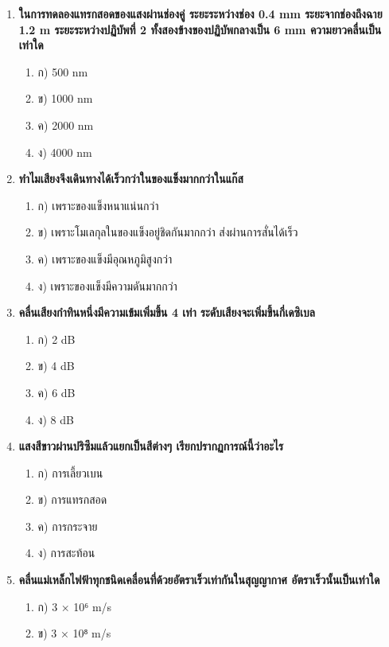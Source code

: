 \documentclass[12pt]{article}
\begin{document}
\begin{enumerate}
\begin{enumerate}
\item ค) แสง → อินฟราเรด → ไมโครเวฟ → คลื่นวิทยุ
\item ง) คลื่นวิทยุ → อัลตราไวโอเลต → รังสีเอกซ์ → รังสีแกมมา
\end{enumerate}
\item \textbf{ในการทดลองแทรกสอดของแสงผ่านช่องคู่ ระยะระหว่างช่อง 0.4 mm ระยะจากช่องถึงฉาย 1.2 m ระยะระหว่างปฏิบัพที่ 2 ทั้งสองข้างของปฏิบัพกลางเป็น 6 mm ความยาวคลื่นเป็นเท่าใด}
\begin{enumerate}
\item ก) 500 nm
\item ข) 1000 nm
\item ค) 2000 nm
\item ง) 4000 nm
\end{enumerate}
\item \textbf{ทำไมเสียงจึงเดินทางได้เร็วกว่าในของแข็งมากกว่าในแก๊ส}
\begin{enumerate}
\item ก) เพราะของแข็งหนาแน่นกว่า
\item ข) เพราะโมเลกุลในของแข็งอยู่ชิดกันมากกว่า ส่งผ่านการสั่นได้เร็ว
\item ค) เพราะของแข็งมีอุณหภูมิสูงกว่า
\item ง) เพราะของแข็งมีความดันมากกว่า
\end{enumerate}
\item \textbf{คลื่นเสียงกำทินหนึ่งมีความเข้มเพิ่มขึ้น 4 เท่า ระดับเสียงจะเพิ่มขึ้นกี่เดซิเบล}
\begin{enumerate}
\item ก) 2 dB
\item ข) 4 dB
\item ค) 6 dB
\item ง) 8 dB
\end{enumerate}
\item \textbf{แสงสีขาวผ่านปริซึมแล้วแยกเป็นสีต่างๆ เรียกปรากฏการณ์นี้ว่าอะไร}
\begin{enumerate}
\item ก) การเลี้ยวเบน
\item ข) การแทรกสอด
\item ค) การกระจาย
\item ง) การสะท้อน
\end{enumerate}
\item \textbf{คลื่นแม่เหล็กไฟฟ้าทุกชนิดเคลื่อนที่ด้วยอัตราเร็วเท่ากันในสุญญากาศ อัตราเร็วนั้นเป็นเท่าใด}
\begin{enumerate}
\item ก) 3 × 10⁶ m/s
\item ข) 3 × 10⁸ m/s

\end{enumerate}
\end{enumerate}
\end{document}
